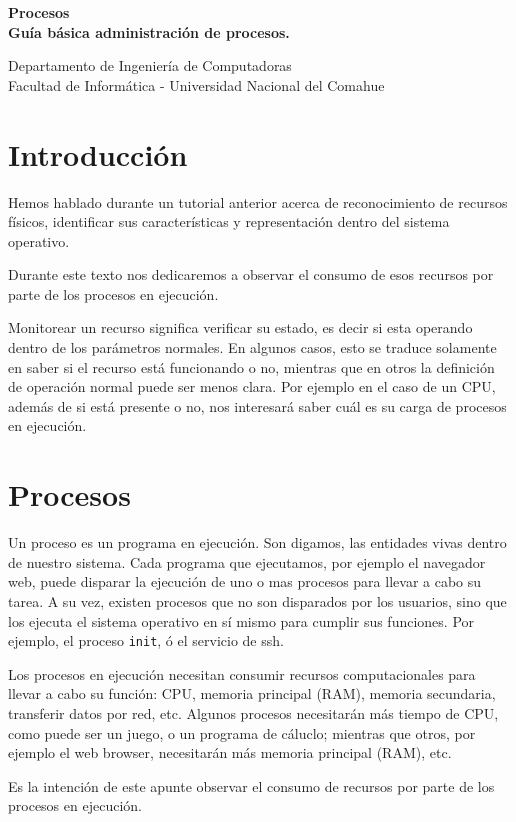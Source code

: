 \documentclass[12pt]{article}
\def\maketitle{

 \makeatletter
 {\color{bl} \centering \huge \sc \textbf{
 Procesos \\ 
\large \vspace*{-8pt} \color{black} Guía básica administración de procesos. 
 \vspace*{8pt} }\par}
 \makeatother


 \makeatletter
 {\centering \small 
 	Departamento de Ingeniería de Computadoras \\
 	Facultad de Informática - Universidad Nacional del Comahue \\
 	\vspace{20pt} }
 \makeatother

}
\begin{document}
\thispagestyle{empty}
\maketitle
\setlength{\parindent}{0pt}

\section*{Introducción}

Hemos hablado durante un tutorial anterior acerca de reconocimiento de recursos 
físicos, identificar sus características y representación dentro del 
sistema operativo.

Durante este texto nos dedicaremos a observar el consumo de esos recursos 
por parte de los procesos en ejecución. 

Monitorear un recurso significa verificar su estado, es decir si esta 
operando dentro de los parámetros normales. En algunos casos, esto se 
traduce solamente en saber si el recurso está funcionando o no, mientras 
que en otros la definición de operación normal puede ser menos clara. 
Por ejemplo en el caso de un CPU, además de si está presente o no, nos 
interesará saber cuál es su carga de procesos en ejecución. 


\section*{Procesos}

Un proceso es un programa en ejecución. Son digamos, las entidades vivas 
dentro de nuestro sistema. Cada programa que ejecutamos, por ejemplo el 
navegador web, puede disparar la ejecución de uno o mas procesos para 
llevar a cabo su tarea.  A su vez, existen procesos que no son disparados 
por los usuarios, sino que los ejecuta el sistema operativo en sí mismo 
para cumplir sus funciones. Por ejemplo, el proceso \texttt{init}, ó el 
servicio de ssh. 

Los procesos en ejecución necesitan consumir recursos computacionales para 
llevar a cabo su función: CPU, memoria principal (RAM), memoria secundaria, 
transferir datos por red, etc. Algunos procesos necesitarán más tiempo de 
CPU, como puede ser un juego, o un programa de cáluclo; mientras que 
otros, por ejemplo el web browser, necesitarán más memoria principal 
(RAM), etc.

Es la intención de este apunte observar el consumo de recursos por parte de 
los procesos en ejecución. 
 
\end{document}
